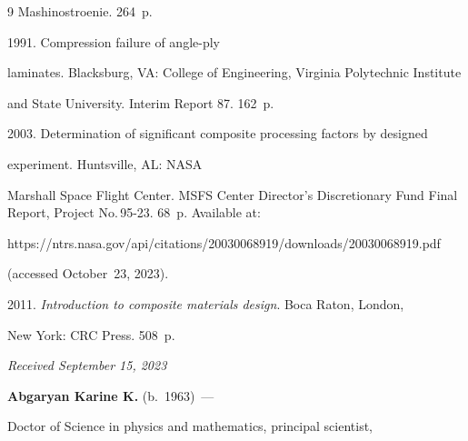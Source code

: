 {{\begin{thebibliography}{9}
Mashinostroenie. 264~p.




 1991. Compression failure of angle-ply 


laminates.  Blacksburg, VA: College of Engineering, Virginia Polytechnic Institute 


and State University. Interim Report 87. 162~p.




 2003. Determination of significant composite processing factors by designed 


experiment.  Huntsville, AL: NASA 


Marshall Space Flight Center. MSFS Center Director's Discretionary Fund Final Report, Project No.\,95-23. 68~p. Available at: {\sf 


https://ntrs.nasa.gov/api/citations/20030068919/downloads/20030068919.pdf} (accessed October~23, 2023).




 2011. \textit{Introduction to composite materials design}. Boca Raton, London, 


New York: CRC Press. 508~p.


\end{thebibliography}


} }





\vspace*{-6pt}





\hfill{\small\textit{Received September 15, 2023}} 





\vspace*{-14pt} 





\Contr





\vspace*{-3pt}





\noindent


\textbf{Abgaryan Karine K.} (b.\ 1963)~--- 


Doctor of Science in physics and mathematics, principal scientist, 



